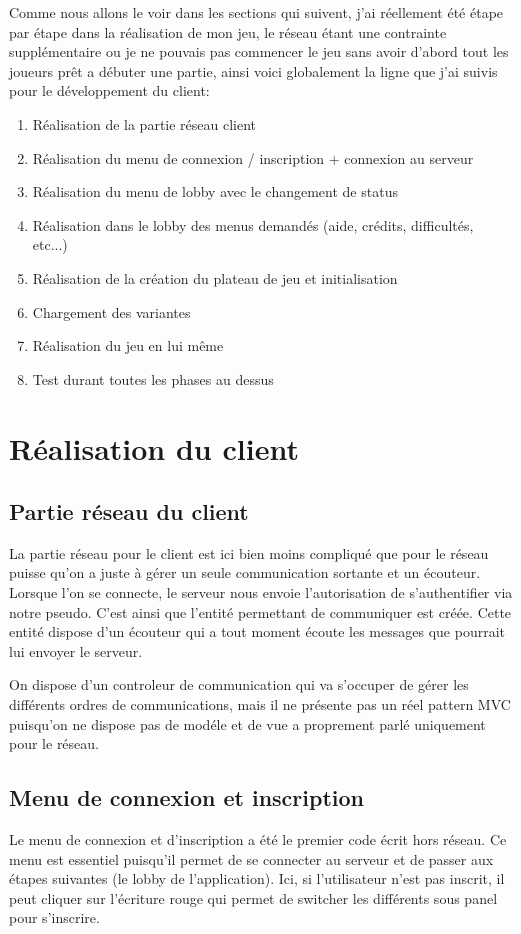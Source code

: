 \documentclass[12pt, openany]{report}
\begin{document}
Comme nous allons le voir dans les sections qui suivent, j'ai réellement été étape par étape dans la réalisation de mon jeu, le réseau étant une contrainte supplémentaire ou je ne pouvais pas commencer le jeu sans avoir d'abord tout les joueurs prêt a débuter une partie, ainsi voici globalement la ligne que j'ai suivis pour le développement du client:

    \begin{enumerate}
        \item Réalisation de la partie réseau client
	\item Réalisation du menu de connexion / inscription + connexion au serveur
	\item Réalisation du menu de lobby avec le changement de status
	\item Réalisation dans le lobby des menus demandés (aide, crédits, difficultés, etc...)
        \item Réalisation de la création du plateau de jeu et initialisation
	\item Chargement des variantes
	\item Réalisation du jeu en lui même
	\item Test durant toutes les phases au dessus
    \end{enumerate} 

    \section {Réalisation du client}
	\subsection{Partie réseau du client}
	La partie réseau pour le client est ici bien moins compliqué que pour le réseau puisse qu'on a juste à gérer un seule communication sortante et un écouteur. Lorsque l'on se connecte, le serveur nous envoie l'autorisation de s'authentifier via notre pseudo. C'est ainsi que l'entité permettant de communiquer est créée. Cette entité dispose d'un écouteur qui a tout moment écoute les messages que pourrait lui envoyer le serveur.

On dispose d'un controleur de communication qui va s'occuper de gérer les différents ordres de communications, mais il ne présente pas un réel pattern MVC puisqu'on ne dispose pas de modéle et de vue a proprement parlé uniquement pour le réseau.

	\subsection{Menu de connexion et inscription}
	Le menu de connexion et d'inscription a été le premier code écrit hors réseau. Ce menu est essentiel puisqu'il permet de se connecter au serveur et de passer aux étapes suivantes (le lobby de l'application). Ici, si l'utilisateur n'est pas inscrit, il peut cliquer sur l'écriture rouge qui permet de switcher les différents sous panel pour s'inscrire.
\end{document}
